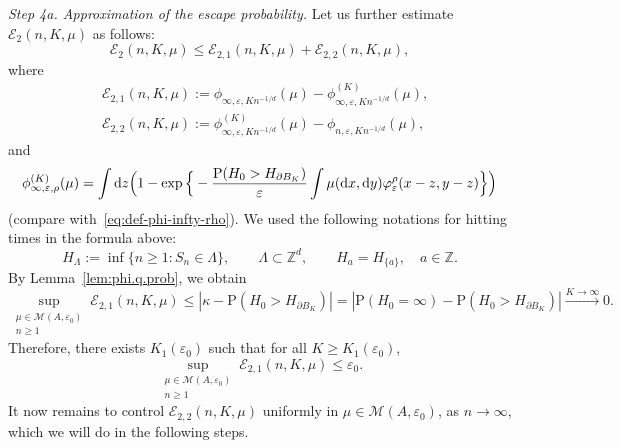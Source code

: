 \documentclass[a4paper,11pt]{amsart}
\numberwithin{equation}{section}
\newcommand{\bbZ}{{\ensuremath{\mathbb Z}} }
\newcommand{\cE}{{\ensuremath{\mathcal E}} }
\newcommand{\cM}{{\ensuremath{\mathcal M}} }
\newcommand{\gep}{\varepsilon}
\newcommand{\gk}{\kappa}
\newcommand{\gL}{\Lambda}
\newcommand{\dd}{\text{\rm d}}             %
\newcommand{\suptwo}[2]{\sup_{\substack{#1 \\ #2}}} %
\newcommand\bP{\ensuremath{\mathrm{P}}}
\newcommand{\8}{\infty}
\newcommand{\beq}{\begin{equation}}
\newcommand{\eeq}{\end{equation}}
\newcommand{\ba}{\begin{aligned}}
\newcommand{\ea}{\end{aligned}}
\begin{document}
{\it Step 4a. Approximation of the escape probability.} Let us further estimate $\cE_2(n,K,\mu)$ as follows:
\beq
\cE_2(n,K,\mu) \le \cE_{2,1}(n,K,\mu) + \cE_{2,2}(n,K,\mu),
\eeq
where
\beq
\ba
&\cE_{2,1}(n,K,\mu) := \phi_{\infty,\gep,Kn^{-1/d}}(\mu) - \phi^{(K)}_{\infty,\gep,Kn^{-1/d}}(\mu),\\
&\cE_{2,2}(n,K,\mu) := \phi^{(K)}_{\infty,\gep,Kn^{-1/d}}(\mu) - \phi_{n,\gep,Kn^{-1/d}}(\mu),
\ea
\eeq
and
\beq
\label{eq:def-phi-infty-rho-K}
\phi^{(K)}_{\infty,\gep,\rho}(\mu)
=\int  \dd z
\Big(1 - \exp\Big\{-\frac{\bP(H_0> H_{\partial B_K})}{\gep} \int \mu(\dd x, \dd y) \varphi_\gep^\rho(x-z,y-z)\Big\}\Big)
\eeq
(compare with~\eqref{eq:def-phi-infty-rho}). We used the following notations for hitting times in the formula above:
\beq
H_{\gL} := \inf\{n\ge 1 \colon S_n\in \gL\}, \qquad \gL\subset \bbZ^d,
\qquad H_{a} = H_{\{a\}}, \quad a\in\bbZ.
\eeq
By Lemma~\ref{lem:phi.q.prob}, we obtain
\beq
\suptwo{\mu\in\cM(A,\gep_0)}{n\ge 1} \cE_{2,1}(n,K,\mu) \le |\gk - \bP(H_0> H_{\partial B_K})| = |\bP(H_0 = \infty) - \bP(H_0> H_{\partial B_K})|\stackrel{K\to\infty}{\longrightarrow} 0.
\eeq
Therefore, there exists $K_1(\gep_0)$ such that for all $K\ge K_1(\gep_0)$,
\beq
\label{eq:cE21}
\suptwo{\mu\in\cM(A,\gep_0)}{n\ge 1} \cE_{2,1}(n,K,\mu) \le \gep_0.
\eeq
It now remains to control $\cE_{2,2}(n,K,\mu)$ uniformly in 
$\mu\in\cM(A,\gep_0)$, as $n\to\infty$, which we will do in the following steps.\\
\end{document}
